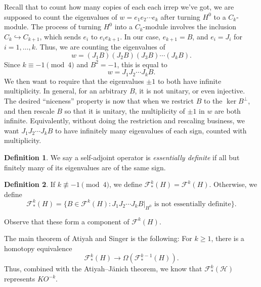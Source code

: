 \documentclass{shortart}
\theoremstyle{definition}
\newtheorem*{defi}{Definition}
\newenvironment{customthm}[1]{\renewcommand\theinnercustomthm{#1}\innercustomthm}{\endinnercustomthm}
\begin{document}
Recall that to count how many copies of each each irrep we've got, we are supposed to count the eigenvalues of $w = e_1 e_2 \cdots e_k$ after turning $H^0$ to a $C_k$-module. The process of turning $H^0$ into a $C_k$-module involves the inclusion $C_k \hookrightarrow C_{k + 1}$, which sends $e_i$ to $e_i e_{k + 1}$. In our case, $e_{k + 1} = B$, and $e_i = J_i$ for $i = 1, \ldots, k$. Thus, we are counting the eigenvalues of
\[
  w = (J_1 B) (J_2 B)(J_3 B) \cdots (J_k B).
\]
Since $k \equiv -1 \pmod 4$ and $B^2 = -1$, this is equal to
\[
  w = J_1 J_2 \cdots J_k B.
\]
We then want to require that the eigenvalues $\pm 1$ to both have infinite multiplicity. In general, for an arbitrary $B$, it is not unitary, or even injective. The desired ``niceness'' property is now that when we restrict $B$ to the $\ker B^\perp$, and then rescale $B$ so that it is unitary, the multiplicity of $\pm 1$ in $w$ are both infinite. Equivalently, without doing the restriction and rescaling business, we want $J_1 J_2 \cdots J_k B$ to have infinitely many eigenvalues of each sign, counted with multiplicity.

\begin{defi}
  We say a self-adjoint operator is \emph{essentially definite} if all but finitely many of its eigenvalues are of the same sign.
\end{defi}

\begin{defi}
  If $k \not\equiv -1\pmod 4$, we define $\mathcal{F}^k_*(H) = \mathcal{F}^k(H)$. Otherwise, we define
  \[
    \mathcal{F}^k_*(H) = \{B \in \mathcal{F}^k(H): J_1 J_2 \cdots J_k B|_{H^0}\text{ is not essentially definite}\}.
  \]
\end{defi}
Observe that these form a component of $\mathcal{F}^k(H)$.

The main theorem of Atiyah and Singer is the following:
\begin{customthm}{A}
  For $k \geq 1$, there is a homotopy equivalence
  \[
    \mathcal{F}^k_*(H) \to \Omega (\mathcal{F}^{k - 1}_*(H)).
  \]
  Thus, combined with the Atiyah--J\"anich theorem, we know that $\mathcal{F}^k_*(\mathcal{H})$ represents $KO^{-k}$.
\end{customthm}
\end{document}
